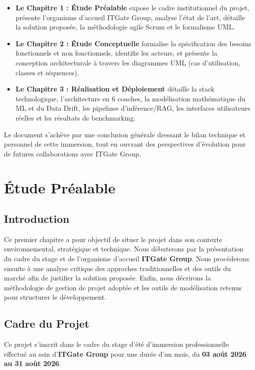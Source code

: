 \documentclass[11pt,a4paper,oneside]{report}
\begin{document}
\begin{itemize}[leftmargin=0.8cm, itemsep=2pt, topsep=3pt]
    \item \textbf{Le Chapitre 1 : Étude Préalable} expose le cadre institutionnel du projet, présente l'organisme d'accueil ITGate Group, analyse l'état de l'art, détaille la solution proposée, la méthodologie agile Scrum et le formalisme UML.
    \item \textbf{Le Chapitre 2 : Étude Conceptuelle} formalise la spécification des besoins fonctionnels et non fonctionnels, identifie les acteurs, et présente la conception architecturale à travers les diagrammes UML (cas d'utilisation, classes et séquences).
    \item \textbf{Le Chapitre 3 : Réalisation et Déploiement} détaille la stack technologique, l'architecture en 6 couches, la modélisation mathématique du ML et du Data Drift, les pipelines d'inférence/RAG, les interfaces utilisateurs réelles et les résultats de benchmarking.
\end{itemize}

Le document s'achève par une conclusion générale dressant le bilan technique et personnel de cette immersion, tout en ouvrant des perspectives d'évolution pour de futures collaborations avec ITGate Group.

\newpage

\chapter{Étude Préalable}

\section{Introduction}
Ce premier chapitre a pour objectif de situer le projet dans son contexte environnemental, stratégique et technique. Nous débuterons par la présentation du cadre du stage et de l'organisme d'accueil \textbf{ITGate Group}. Nous procéderons ensuite à une analyse critique des approches traditionnelles et des outils du marché afin de justifier la solution proposée. Enfin, nous décrirons la méthodologie de gestion de projet adoptée et les outils de modélisation retenus pour structurer le développement.

\section{Cadre du Projet}
Ce projet s'inscrit dans le cadre du stage d'été d'immersion professionnelle effectué au sein d'\textbf{ITGate Group} pour une durée d'un mois, du \textbf{03 août 2026 au 31 août 2026}. 
\end{document}
